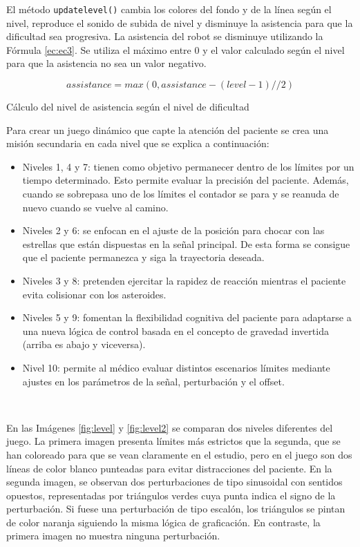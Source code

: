 El método \verb|updatelevel()| cambia los colores del fondo y de la línea según el nivel, reproduce el sonido de subida de nivel y disminuye la asistencia para que la dificultad sea progresiva.
La asistencia del robot se disminuye utilizando la Fórmula \ref{ec:ec3}.
Se utiliza el máximo entre 0 y el valor calculado según el nivel para que la asistencia no sea un valor negativo.

\begin{myequation}[h]
\begin{equation}
assistance = max(0, assistance - (level - 1) // 2)
\nonumber
\label{ec:ec3}
\end{equation}
\caption[Cálculo del nivel de asistencia según el nivel de dificultad]{Cálculo del nivel de asistencia según el nivel de dificultad}
\end{myequation}

Para crear un juego dinámico que capte la atención del paciente se crea una misión secundaria en cada nivel que se explica a continuación:
\begin{itemize}
    \item Niveles 1, 4 y 7: tienen como objetivo permanecer dentro de los límites por un tiempo determinado. Esto permite evaluar la precisión del paciente. Además, cuando se sobrepasa uno de los límites el contador se para y se reanuda de nuevo cuando se vuelve al camino.
	\item Niveles 2 y 6: se enfocan en el ajuste de la posición para chocar con las estrellas que están dispuestas en la señal principal. De esta forma se consigue que el paciente permanezca y siga la trayectoria deseada.
	\item Niveles 3 y 8: pretenden ejercitar la rapidez de reacción mientras el paciente evita colisionar con los asteroides.
	\item Niveles 5 y 9: fomentan la flexibilidad cognitiva del paciente para adaptarse a una nueva lógica de control basada en el concepto de gravedad invertida (arriba es abajo y viceversa).
	\item Nivel 10: permite al médico evaluar distintos escenarios límites mediante ajustes en los parámetros de la señal, perturbación y el offset.
\end{itemize}\

En las Imágenes \ref{fig:level} y \ref{fig:level2} se comparan dos niveles diferentes del juego.
La primera imagen presenta límites más estrictos que la segunda, que se han coloreado para que se vean claramente en el estudio, pero en el juego son dos líneas de color blanco punteadas para evitar distracciones del paciente.
En la segunda imagen, se observan dos perturbaciones de tipo sinusoidal con sentidos opuestos, representadas por triángulos verdes cuya punta indica el signo de la perturbación.
Si fuese una perturbación de tipo escalón, los triángulos se pintan de color naranja siguiendo la misma lógica de graficación.
En contraste, la primera imagen no muestra ninguna perturbación.

